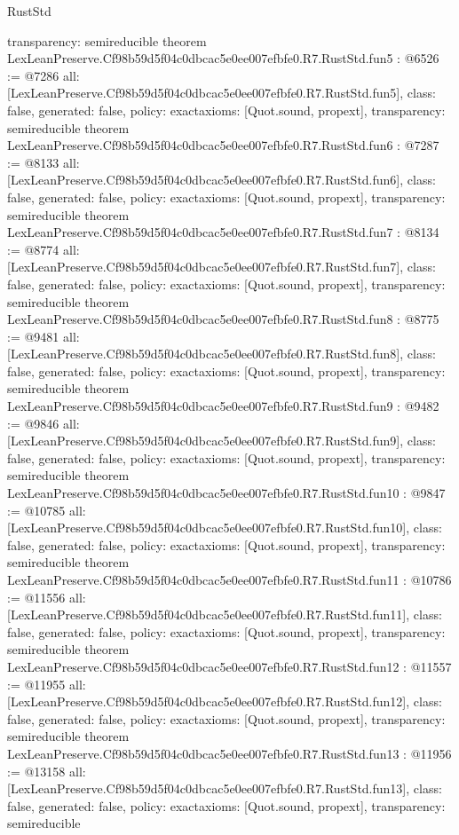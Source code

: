 \begin{lexlean}{RustStd}
\begin{coremodule}
{  transparency: semireducible
}
theorem LexLeanPreserve.Cf98b59d5f04c0dbcac5e0ee007efbfe0.R7.RustStd.fun5 : @6526 := @7286 {
  all: [LexLeanPreserve.Cf98b59d5f04c0dbcac5e0ee007efbfe0.R7.RustStd.fun5],
  class: false,
  generated: false,
  policy: exact{axioms: [Quot.sound, propext]},
  transparency: semireducible
}
theorem LexLeanPreserve.Cf98b59d5f04c0dbcac5e0ee007efbfe0.R7.RustStd.fun6 : @7287 := @8133 {
  all: [LexLeanPreserve.Cf98b59d5f04c0dbcac5e0ee007efbfe0.R7.RustStd.fun6],
  class: false,
  generated: false,
  policy: exact{axioms: [Quot.sound, propext]},
  transparency: semireducible
}
theorem LexLeanPreserve.Cf98b59d5f04c0dbcac5e0ee007efbfe0.R7.RustStd.fun7 : @8134 := @8774 {
  all: [LexLeanPreserve.Cf98b59d5f04c0dbcac5e0ee007efbfe0.R7.RustStd.fun7],
  class: false,
  generated: false,
  policy: exact{axioms: [Quot.sound, propext]},
  transparency: semireducible
}
theorem LexLeanPreserve.Cf98b59d5f04c0dbcac5e0ee007efbfe0.R7.RustStd.fun8 : @8775 := @9481 {
  all: [LexLeanPreserve.Cf98b59d5f04c0dbcac5e0ee007efbfe0.R7.RustStd.fun8],
  class: false,
  generated: false,
  policy: exact{axioms: [Quot.sound, propext]},
  transparency: semireducible
}
theorem LexLeanPreserve.Cf98b59d5f04c0dbcac5e0ee007efbfe0.R7.RustStd.fun9 : @9482 := @9846 {
  all: [LexLeanPreserve.Cf98b59d5f04c0dbcac5e0ee007efbfe0.R7.RustStd.fun9],
  class: false,
  generated: false,
  policy: exact{axioms: [Quot.sound, propext]},
  transparency: semireducible
}
theorem LexLeanPreserve.Cf98b59d5f04c0dbcac5e0ee007efbfe0.R7.RustStd.fun10 : @9847 := @10785 {
  all: [LexLeanPreserve.Cf98b59d5f04c0dbcac5e0ee007efbfe0.R7.RustStd.fun10],
  class: false,
  generated: false,
  policy: exact{axioms: [Quot.sound, propext]},
  transparency: semireducible
}
theorem LexLeanPreserve.Cf98b59d5f04c0dbcac5e0ee007efbfe0.R7.RustStd.fun11 : @10786 := @11556 {
  all: [LexLeanPreserve.Cf98b59d5f04c0dbcac5e0ee007efbfe0.R7.RustStd.fun11],
  class: false,
  generated: false,
  policy: exact{axioms: [Quot.sound, propext]},
  transparency: semireducible
}
theorem LexLeanPreserve.Cf98b59d5f04c0dbcac5e0ee007efbfe0.R7.RustStd.fun12 : @11557 := @11955 {
  all: [LexLeanPreserve.Cf98b59d5f04c0dbcac5e0ee007efbfe0.R7.RustStd.fun12],
  class: false,
  generated: false,
  policy: exact{axioms: [Quot.sound, propext]},
  transparency: semireducible
}
theorem LexLeanPreserve.Cf98b59d5f04c0dbcac5e0ee007efbfe0.R7.RustStd.fun13 : @11956 := @13158 {
  all: [LexLeanPreserve.Cf98b59d5f04c0dbcac5e0ee007efbfe0.R7.RustStd.fun13],
  class: false,
  generated: false,
  policy: exact{axioms: [Quot.sound, propext]},
  transparency: semireducible
}
\end{coremodule}
\end{lexlean}
